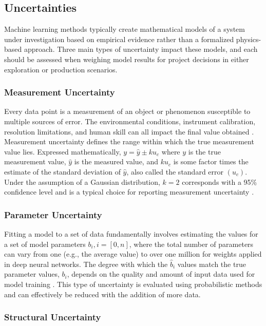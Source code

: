 \subsection{Uncertainties}

Machine learning methods typically create mathematical models of a system under investigation based on empirical evidence rather than a formalized physics-based approach. Three main types of uncertainty impact these models, and each should be assessed when weighing model results for project decisions in either exploration or production scenarios. 

\subsubsection{Measurement Uncertainty}

Every data point is a measurement of an object or phenomenon susceptible to multiple sources of error. The environmental conditions, instrument calibration, resolution limitations, and human skill can all impact the final value obtained \citep[~p. 11-14]{baird_experimentation_1962}. Measurement uncertainty defines the range within which the true measurement value lies. Expressed mathematically, $y=\hat{y} \pm ku_c$ where $y$ is the true measurement value, $\hat{y}$ is the measured value, and $ku_c$ is some factor times the estimate of the standard deviation of $\hat{y}$, also called the standard error $(u_c)$. Under the assumption of a Gaussian distribution, $k=2$  corresponds with a 95\% confidence level and is a typical choice for reporting measurement uncertainty \citep{nist_nist_2021}.

\subsubsection{Parameter Uncertainty}

Fitting a model to a set of data fundamentally involves estimating the values for a set of model parameters $b_i, i = [0, n]$, where the total number of parameters can vary from one (e.g., the average value) to over one million for weights applied in deep neural networks. The degree with which the $\hat{b}_i$ values match the true parameter values, $b_i$, depends on the quality and amount of input data used for model training \citep[~p. 81]{james_introduction_2013}. This type of uncertainty is evaluated using probabilistic methods and can effectively be reduced with the addition of more data. 

\subsubsection{Structural Uncertainty}

